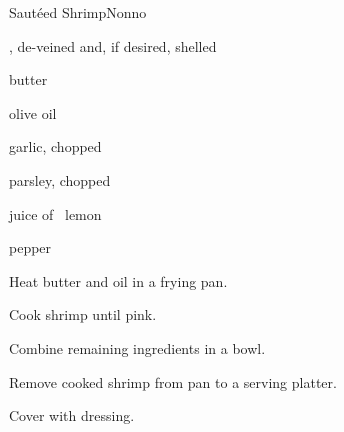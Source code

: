 \begin{recipe}{Saut\'eed Shrimp}{Nonno}{}

\begin{ingredients}
\item {}, de-veined and, if desired, shelled
\item butter
\item olive oil
\item garlic, chopped
\item parsley, chopped
\item juice of \half~lemon
\item pepper
\end{ingredients}

\begin{directions}
\item Heat butter and oil in a frying pan.
\item Cook shrimp until pink.
\item Combine remaining ingredients in a bowl.
\item Remove cooked shrimp from pan to a serving platter.
\item Cover with dressing.
\end{directions}

\end{recipe}

